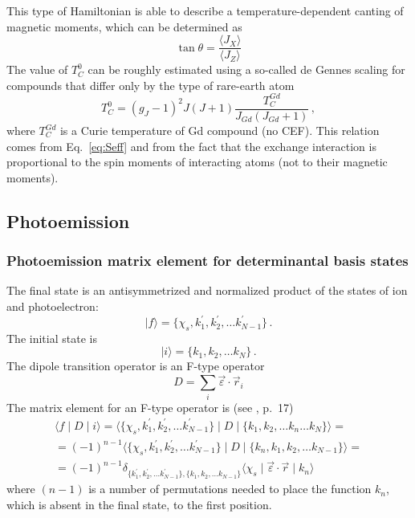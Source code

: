 \documentclass[a4paper,oneside,12pt]{extarticle}
\begin{document}
This type of Hamiltonian is able to describe a temperature-dependent canting of magnetic moments, which can be determined as \cite{Takano_JMMM_1987}
$$
\tan\theta = \frac{\langle J_X \rangle}{\langle J_Z \rangle}
$$
%
The value of $T_C^0$ can be roughly estimated using a so-called de Gennes scaling for compounds that differ only by the type of rare-earth atom \cite{Kliemt_CRT_2020}
$$
T_C^0 = (g_J-1)^2 J(J+1) \frac{T_C^{Gd}}{J_{Gd}(J_{Gd}+1)} \,,
$$
where $T_C^{Gd}$ is a Curie temperature of Gd compound (no CEF).
This relation comes from Eq.~\ref{eq:Seff} and from the fact that the exchange interaction is proportional to the spin moments of interacting atoms (not to their magnetic moments).
%


\subsection {Photoemission}


\subsubsection {Photoemission matrix element for determinantal basis states}
%
The final state is an antisymmetrized and normalized product of the states of ion and photoelectron:
$$
| f \rangle = \{\chi_s, k_1^{\prime}, k_2^{\prime}, \ldots k_{N-1}^{\prime} \} \,.
$$
%
The initial state is
%
$$
| i \rangle = \{k_1, k_2, \ldots k_{N} \} \,.
$$
%
The dipole transition operator is an F-type operator
$$
D = \sum_i \vec{\varepsilon} \cdot \vec{r}_i
$$
%
The matrix element for an F-type operator is (see \cite{Judd}, p.~17)
%
\begin{multline}
\langle f \mid D \mid i \rangle =
\langle \{\chi_s, k_1^{\prime}, k_2^{\prime}, \ldots k_{N-1}^{\prime} \} \mid D \mid \{k_1, k_2, \ldots k_n \ldots k_{N} \} \rangle = \\
= (-1)^{n-1} \langle \{\chi_s, k_1^{\prime}, k_2^{\prime}, \ldots k_{N-1}^{\prime} \} \mid D \mid \{k_n, k_1, k_2, \ldots k_{N-1} \} \rangle = \\
= (-1)^{n-1}
\delta_{\{k_1^{\prime}, k_2^{\prime}, \ldots k_{N-1}^{\prime}\}, \{k_1, k_2, \ldots k_{N-1} \}}
\langle \chi_s \mid \vec{\varepsilon} \cdot \vec{r} \mid k_{n} \rangle
\end{multline}
%
where $(n-1)$ is a number of permutations needed to place the function $k_n$, which is absent in the final state, to the first position.
\end{document}
